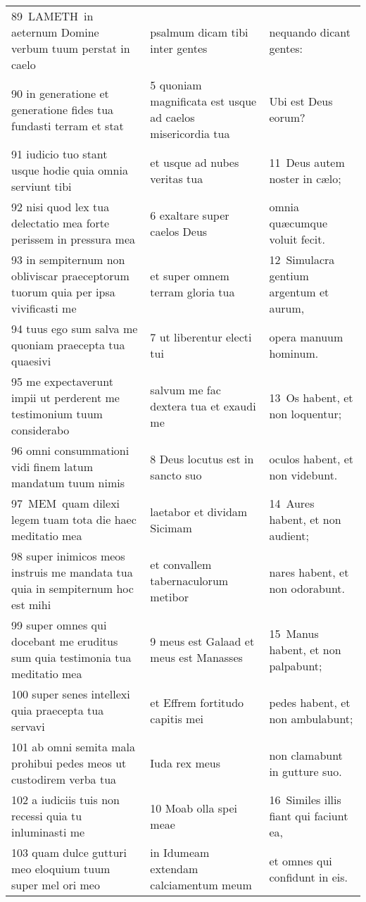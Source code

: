 \documentclass{article}
\begin{document}
\begin{longtable}{@{}p{}p{}p{}@{}}
89 LAMETH in aeternum Domine verbum tuum perstat in caelo	&	psalmum dicam tibi inter gentes	&	nequando dicant gentes:	\\
90 in generatione et generatione fides tua fundasti terram et stat	&	5 quoniam magnificata est usque ad caelos misericordia tua	&	Ubi est Deus eorum?	\\
91 iudicio tuo stant usque hodie quia omnia serviunt tibi	&	et usque ad nubes veritas tua	&	11 Deus autem noster in cælo;	\\
92 nisi quod lex tua delectatio mea forte perissem in pressura mea	&	6 exaltare super caelos Deus	&	omnia quæcumque voluit fecit.	\\
93 in sempiternum non obliviscar praeceptorum tuorum quia per ipsa vivificasti me	&	et super omnem terram gloria tua	&	12 Simulacra gentium argentum et aurum,	\\
94 tuus ego sum salva me quoniam praecepta tua quaesivi	&	7 ut liberentur electi tui	&	opera manuum hominum.	\\
95 me expectaverunt impii ut perderent me testimonium tuum considerabo	&	salvum me fac dextera tua et exaudi me	&	13 Os habent, et non loquentur;	\\
96 omni consummationi vidi finem latum mandatum tuum nimis	&	8 Deus locutus est in sancto suo	&	oculos habent, et non videbunt.	\\
97 MEM quam dilexi legem tuam tota die haec meditatio mea	&	laetabor et dividam Sicimam	&	14 Aures habent, et non audient;	\\
98 super inimicos meos instruis me mandata tua quia in sempiternum hoc est mihi	&	et convallem tabernaculorum metibor	&	nares habent, et non odorabunt.	\\
99 super omnes qui docebant me eruditus sum quia testimonia tua meditatio mea	&	9 meus est Galaad et meus est Manasses	&	15 Manus habent, et non palpabunt;	\\
100 super senes intellexi quia praecepta tua servavi	&	et Effrem fortitudo capitis mei	&	pedes habent, et non ambulabunt;	\\
101 ab omni semita mala prohibui pedes meos ut custodirem verba tua	&	Iuda rex meus	&	non clamabunt in gutture suo.	\\
102 a iudiciis tuis non recessi quia tu inluminasti me	&	10 Moab olla spei meae	&	16 Similes illis fiant qui faciunt ea,	\\
103 quam dulce gutturi meo eloquium tuum super mel ori meo	&	in Idumeam extendam calciamentum meum	&	et omnes qui confidunt in eis.	\\

\end{longtable}
\end{document}
